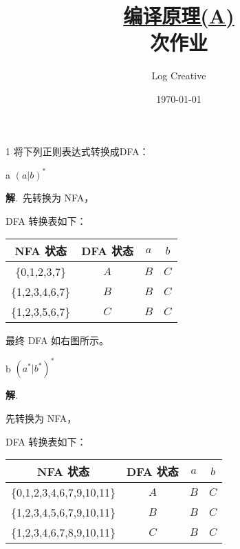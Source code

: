 \documentclass[12pt,a4paper]{article}
\newenvironment{problems}{\begin{list}{}{\renewcommand{\makelabel}[1]{\textbf{##1}\hfil}}}{\end{list}}
\newenvironment{steps}{\begin{list}{}{\renewcommand{\makelabel}[1]{##1)\hfil}}}{\end{list}}
\providecommand{\sol}{\textbf{解}.~}
\begin{document}
\title{\normalsize \underline{编译原理(A)}\\ 次作业}
\author{Log Creative }
\date{\today}
\maketitle

\begin{problems}
    \item[1] 将下列正则表达式转换成DFA：
    \begin{steps}
        \item[a] $(a|b)^*$
        
        \sol 先转换为 NFA，

        

        \begin{multicols}{2}
            DFA 转换表如下：
        
        \begin{tabular}{cc|cc}
            \hline
            NFA 状态 & DFA 状态 & $a$ & $b$ \\
            \hline
            \{0,1,2,3,7\} & $A$ & $B$ & $C$ \\
            \{1,2,3,4,6,7\} & $B$ & $B$ & $C$ \\
            \{1,2,3,5,6,7\} & $C$ & $B$ & $C$ \\
            \hline
        \end{tabular}

        最终 DFA 如右图所示。

        

        \end{multicols}

        \item[b] $(a^*|b^*)^*$
        
        \sol 

        先转换为 NFA，

        

        \begin{multicols}{2}
            DFA 转换表如下：
        
        \begin{tabular}{cc|cc}
            \hline
            NFA 状态 & DFA 状态 & $a$ & $b$ \\
            \hline
            \{0,1,2,3,4,6,7,9,10,11\} & $A$ & $B$ & $C$ \\
            \{1,2,3,4,5,6,7,9,10,11\} & $B$ & $B$ & $C$ \\
            \{1,2,3,4,6,7,8,9,10,11\} & $C$ & $B$ & $C$ \\
            \hline
        \end{tabular}


\end{multicols}
\end{steps}
\end{problems}
\end{document}
